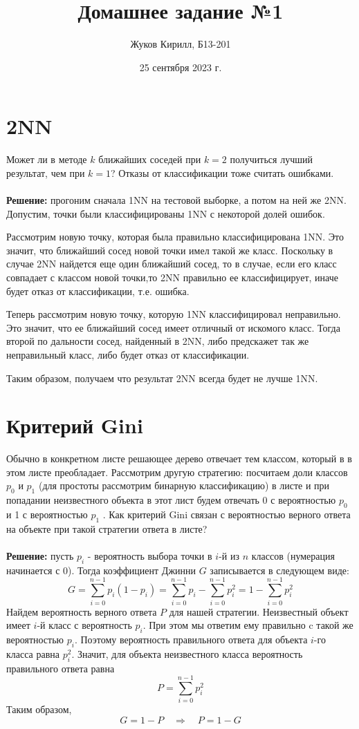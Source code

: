 \documentclass[a4paper]{article}
\title{Домашнее задание №1}
\author{Жуков Кирилл, Б13-201}
\date{\small{25 сентября 2023 г.}}
\begin{document}
\maketitle

\section{2NN}
Может ли в методе $k$ ближайших соседей при $k = 2$ получиться лучший результат, чем при $k = 1$? Отказы от классификации тоже считать ошибками.
\\ \\
\textbf{Решение:} прогоним сначала 1NN на тестовой выборке, а потом на ней же 2NN. Допустим, точки были классифицированы 1NN с некоторой долей ошибок.

Рассмотрим новую точку, которая была правильно классифицирована 1NN. Это значит, что ближайший сосед новой точки имел такой же класс. Поскольку в случае 2NN найдется еще один ближайший сосед, то в случае, если его класс совпадает с классом новой точки,то 2NN правильно ее классифицирует, иначе будет отказ от классификации, т.е. ошибка.

Теперь рассмотрим новую точку, которую 1NN классифицировал неправильно. Это значит, что ее ближайший сосед имеет отличный от искомого класс. Тогда второй по дальности сосед, найденный в 2NN, либо предскажет так же неправильный класс, либо будет отказ от классификации.

Таким образом, получаем что результат 2NN всегда будет не лучше 1NN.
\pagebreak

\section{Критерий Gini}\label{2}
Обычно в конкретном листе решающее дерево отвечает тем классом, который в в этом листе преобладает. Рассмотрим другую стратегию: посчитаем доли классов $p_0$ и $p_1$ (для простоты рассмотрим бинарную классификацию) в листе и при попадании неизвестного объекта в этот лист будем отвечать
0 с вероятностью $p_0$ и 1 с вероятностью $p_1$ . Как критерий Gini связан с вероятностью верного ответа на объекте при такой стратегии ответа в листе?
\\ \\
\textbf{Решение:} пусть $p_i$ - вероятность выбора точки в $i$-й из $n$ классов (нумерация начинается с 0). Тогда коэффициент Джинни $G$ записывается в следующем виде:
$$
G = \sum\limits_{i = 0}^{n-1} p_i(1-p_i) = \sum\limits_{i = 0}^{n-1} p_i - 
\sum\limits_{i = 0}^{n-1} p_i^2 = 1 - \sum\limits_{i = 0}^{n-1} p_i^2
$$
Найдем вероятность верного ответа $P$ для нашей стратегии. Неизвестный объект имеет $i$-й класс с вероятность $p_i$. При этом мы ответим ему правильно c такой же вероятностью $p_i$. Поэтому вероятность правильного ответа для объекта $i$-го класса равна $p_i^2$. Значит, для объекта неизвестного класса вероятность правильного ответа равна
$$
P = \sum\limits_{i = 0}^{n-1} p_i^2
$$
Таким образом,
$$
G = 1 - P \quad\Rightarrow\quad  P = 1 - G
$$
\pagebreak
\end{document}
